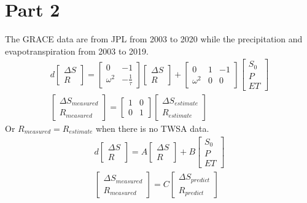 \section{Part 2}
The GRACE data are from JPL from 2003 to 2020 while the precipitation and evapotranspiration from 2003 to 2019. 
\begin{gather*}
	d \begin{bmatrix}
		\Delta S\\
		R
	\end{bmatrix} = \begin{bmatrix}
	0 & -1 \\
	\omega^2 & -\frac{1}{\tau}
\end{bmatrix} \begin{bmatrix}
\Delta S\\
R
\end{bmatrix} + \begin{bmatrix}
0 & 1 & -1 \\
\omega^2 & 0 & 0
\end{bmatrix} \begin{bmatrix}
S_{0}\\
P\\
ET
\end{bmatrix} \\
\begin{bmatrix}
	\Delta S_{measured} \\
	R_{measured}
\end{bmatrix} = \begin{bmatrix}
1 & 0 \\
0 & 1
\end{bmatrix} \begin{bmatrix}
\Delta S_{estimate} \\
R_{estimate} 
\end{bmatrix} 
\end{gather*}
Or $R_{measured} = R_{estimate}$ when there is no TWSA data.
\begin{gather*}
		d \begin{bmatrix}
		\Delta S\\
		R
	\end{bmatrix} = A\begin{bmatrix}
	\Delta S\\
	R
\end{bmatrix} + B \begin{bmatrix}
S_{0}\\
P\\
ET
\end{bmatrix} \\
\begin{bmatrix}
	\Delta S_{measured} \\
	R_{measured}
\end{bmatrix} = C \begin{bmatrix}
	\Delta S_{predict} \\
	R_{predict} 
\end{bmatrix} 
\end{gather*}
